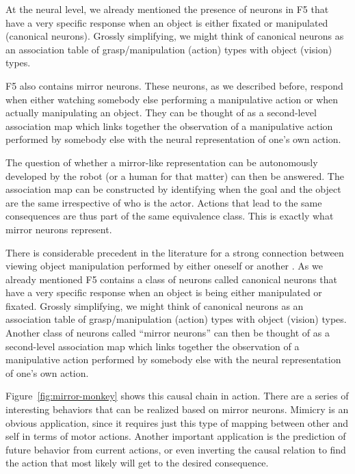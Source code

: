 At the neural level, we already mentioned the presence of neurons in
F5 that have a very specific response when an object is either fixated
or manipulated (canonical neurons). Grossly simplifying, we might
think of canonical neurons as an association table of
grasp/manipulation (action) types with object (vision) types.

F5 also contains mirror neurons. These neurons, as we described
before, respond when either watching somebody else performing a
manipulative action or when actually manipulating an object. They can
be thought of as a second-level association map which links together
the observation of a manipulative action performed by somebody else
with the neural representation of one's own action.

The question of whether a mirror-like representation can be
autonomously developed by the robot (or a human for that matter) can
then be answered. The association map can be constructed by
identifying when the goal and the object are the same irrespective of
who is the actor. Actions that lead to the same consequences are thus
part of the same equivalence class.  This is exactly what mirror neurons
represent.


\ifverbose
There is considerable precedent in the literature for a strong
connection between viewing object manipulation performed by either
oneself or another \cite{wohlsclager02human}.  As we already mentioned
F5 contains a class of neurons called canonical neurons that have a
very specific response when an object is being either manipulated or
fixated.  Grossly simplifying, we might think of canonical neurons as
an association table of grasp/manipulation (action) types with object
(vision) types.  Another class of neurons called ``mirror neurons''
can then be thought of as a second-level association map which links
together the observation of a manipulative action performed by
somebody else with the neural representation of one's own action.
\fi

Figure~\ref{fig:mirror-monkey} shows this causal chain in action.
There are a series of interesting behaviors that can be realized based
on mirror neurons. Mimicry is an obvious application, since it
requires just this type of mapping between other and self in terms of
motor actions.  Another important application is the prediction of
future behavior from current actions, or even inverting the causal
relation to find the action that most likely will get to the desired
consequence.

\ifverbose

